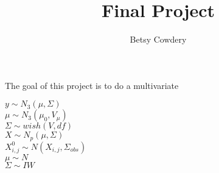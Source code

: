 \documentclass[11pt,fleqn]{article}
\theoremstyle{definition}
\theoremstyle{remark}
\theoremstyle{definition}
\begin{document}
\author{Betsy Cowdery}
\title{Final Project}
\date{}

\maketitle

The goal of this project is to do a multivariate 

\noindent
$y \sim N_3(\mu, \Sigma)$ \\
$\mu \sim N_3 (\mu_0, V_\mu)$\\
$\Sigma \sim wish(V,df)$\\
$X \sim N_p(\mu,\Sigma)$\\
$X^0_{i,j} \sim N(X_{i,j}, \Sigma_{obs}) $\\
$\mu \sim N $\\
$\Sigma \sim IW $\\
\end{document}
